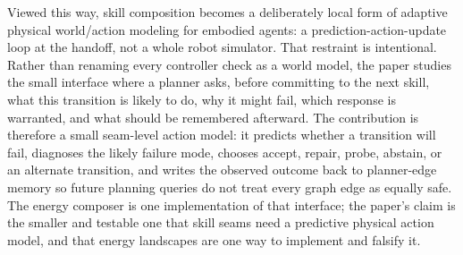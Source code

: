 \documentclass{article}
\begin{document}
Viewed this way, skill composition becomes a deliberately local form of adaptive physical world/action modeling for embodied agents: a prediction-action-update loop at the handoff, not a whole robot simulator. That restraint is intentional. Rather than renaming every controller check as a world model, the paper studies the small interface where a planner asks, before committing to the next skill, what this transition is likely to do, why it might fail, which response is warranted, and what should be remembered afterward.
The contribution is therefore a small seam-level action model: it predicts whether a transition will fail, diagnoses the likely failure mode, chooses accept, repair, probe, abstain, or an alternate transition, and writes the observed outcome back to planner-edge memory so future planning queries do not treat every graph edge as equally safe. The energy composer is one implementation of that interface; the paper's claim is the smaller and testable one that skill seams need a predictive physical action model, and that energy landscapes are one way to implement and falsify it.
\end{document}
